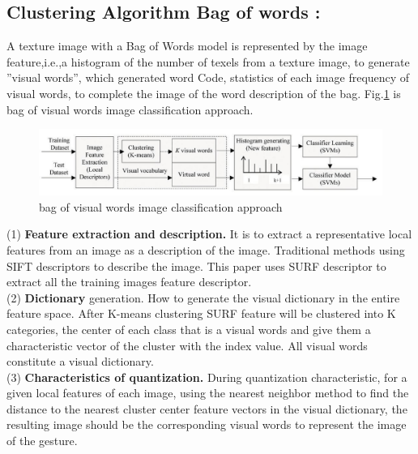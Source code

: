 \subsection{Clustering Algorithm Bag of words :}
A texture image with a Bag of Words
model is represented by the image feature,i.e.,a histogram of
the number of texels from a texture image, to generate ”visual
words”, which generated word Code, statistics of each image
frequency of visual words, to complete the image of the word
description of the bag. Fig.\ref{fig:bag} is bag of visual words image
classiﬁcation approach.\\
\begin{figure}[H]
\centering
\includegraphics[width=1.0\textwidth]{img/BAG.jpg}
\caption{ bag of visual words image classification approach   }
\label{fig:bag}
\end{figure}
(1) \textbf{Feature extraction and description.} It is to extract a
representative local features from an image as a description
of the image. Traditional methods using SIFT descriptors to
describe the image. This paper uses SURF  descriptor
to extract all the training images feature descriptor. \\(2)\textbf{ Dictionary}
generation. How to generate the visual dictionary in the
entire feature space. After K-means clustering SURF 
feature will be clustered into K categories, the center of each class that is a visual words and give them a characteristic vector of the cluster with the index value. All visual words constitute
a visual dictionary. \\(3)\textbf{ Characteristics of quantization.} During
quantization characteristic, for a given local features of each
image, using the nearest neighbor method to find the distance
to the nearest cluster center feature vectors in the visual
dictionary, the resulting image should be the corresponding
visual words to represent the image of the gesture.\\


